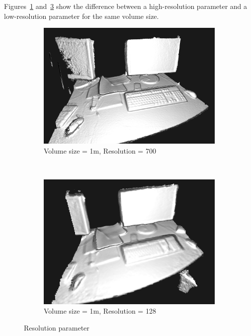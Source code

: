 \documentclass[12pt, twoside]{article}
\begin{document}
Figures~\ref{fig:highres} and~\ref{fig:lowres} show the difference between a high-resolution parameter and a low-resolution parameter for the same volume size.

\begin{figure}[h]
        \centering
        \begin{subfigure}[b]{0.45\textwidth}
                \includegraphics[width=1\textwidth]{HighRes.png}
                \caption{Volume size = 1m, Resolution = 700}
                \label{fig:highres}
        \end{subfigure}~
        \begin{subfigure}[b]{0.45\textwidth}
                \includegraphics[width=1\textwidth]{LowRes.png}
                \caption{Volume size = 1m, Resolution = 128}
                \label{fig:lowres}
        \end{subfigure}
        \caption{Resolution parameter}
        
\end{figure}
\end{document}
